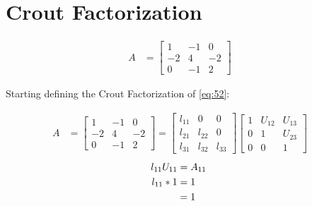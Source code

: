 \section{Crout Factorization}
	
	\begin{align}
		A &= \begin{bmatrix}
				1 & -1 & 0 \\[0.3em]
				-2 & 4 & -2 \\[0.3em]
				0 & -1 & 2
			\end{bmatrix}&
	\label{eq:52}
	\end{align}

	Starting defining the Crout Factorization of \cref{eq:52}:

	\begin{align}
		A &= \begin{bmatrix}
				1 & -1 & 0 \\[0.3em]
				-2 & 4 & -2 \\[0.3em]
				0 & -1 & 2
			\end{bmatrix}
			=
			\begin{bmatrix}
				l_{11} & 0 & 0 \\[0.3em]
				l_{21} & l_{22} & 0 \\[0.3em]
				l_{31} & l_{32} & l_{33}
			\end{bmatrix}
			\begin{bmatrix}
				1 & U_{12} & U_{13} \\[0.3em]
				0 & 1 & U_{23} \\[0.3em]
				0 & 0 & 1
			\end{bmatrix}&
	\end{align}
	\begin{align}
		l_{11}U_{11} &= A_{11}& \notag \\
		l_{11}*1 &= 1& \notag \\
		&= 1&
	\end{align}
